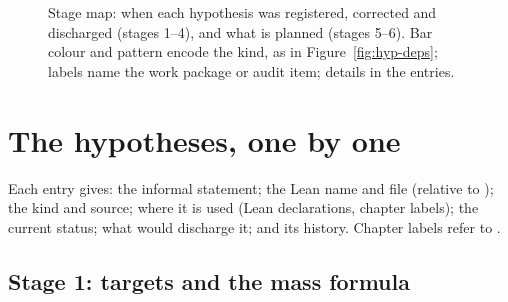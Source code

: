 \begin{figure}[!tbp]\centering
\resizebox{\textwidth}{!}{}
\caption{Stage map: when each hypothesis was registered, corrected and discharged (stages 1--4), and what is
planned (stages 5--6). Bar colour and pattern encode the kind, as in Figure~\ref{fig:hyp-deps}; labels name the work package or audit item; details in the entries.}
\label{fig:hyp-timeline}
\end{figure}

\section{The hypotheses, one by one}\label{sec:hyp-entries}

Each entry gives: the informal statement; the Lean name and file (relative to ); the kind
and source; where it is used (Lean declarations, chapter labels); the current status; what would discharge it; and its
history. Chapter labels refer to .

\subsection{Stage 1: targets and the mass formula}


